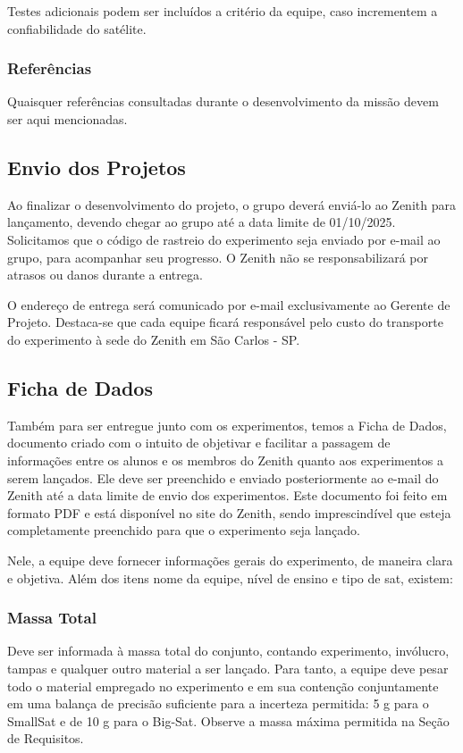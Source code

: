             Testes adicionais podem ser incluídos a critério da equipe, caso incrementem a confiabilidade do satélite.

        \subsubsection{Referências}
            Quaisquer referências consultadas durante o desenvolvimento da missão devem ser aqui mencionadas.

    \subsection{Envio dos Projetos}\label{sec: envio}
        Ao finalizar o desenvolvimento do projeto, o grupo deverá enviá-lo ao Zenith para 
        lançamento, devendo chegar ao grupo até a data limite de 01/10/2025. 
        Solicitamos que o código de rastreio do experimento seja enviado por 
        e-mail ao grupo, para acompanhar seu progresso. O Zenith não se responsabilizará 
        por atrasos ou danos durante a entrega.
        
        O endereço de entrega será comunicado por e-mail exclusivamente ao Gerente de Projeto. Destaca-se que cada equipe ficará responsável pelo custo do transporte do experimento à sede do Zenith em São Carlos - SP.
    
    \subsection{Ficha de Dados}\label{sec: ficha_dados}
        Também para ser entregue junto com os experimentos, temos a Ficha de Dados, 
        documento criado com o intuito de objetivar e facilitar a passagem de informações
        entre os alunos e os membros do Zenith quanto aos experimentos a serem lançados. 
        Ele deve ser preenchido e enviado posteriormente ao e-mail do Zenith até a data 
        limite de envio dos experimentos. Este documento foi feito em formato PDF e está 
        disponível no site do Zenith, sendo imprescindível que esteja completamente 
        preenchido para que o experimento seja lançado.
        
        Nele, a equipe deve fornecer informações gerais do experimento, de maneira clara e objetiva. Além dos itens nome da equipe, nível de ensino e tipo de sat, existem:

        \subsubsection{Massa Total}
            Deve ser informada à massa total do conjunto, contando experimento, invólucro, tampas e qualquer outro material a ser lançado. Para tanto, a equipe deve pesar todo o material empregado no experimento e em sua contenção conjuntamente em uma balança de precisão suficiente para a incerteza permitida: 5 g para o SmallSat e de 10 g para o Big-Sat. Observe a massa máxima permitida na Seção de Requisitos.
            

